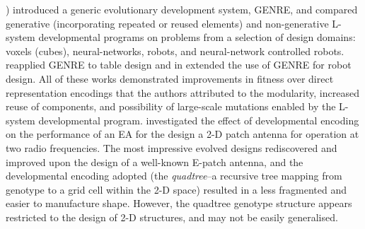 \cite{Hornby:2003jt}) introduced a generic evolutionary development system, GENRE, and compared generative (incorporating repeated or reused elements) and non-generative L-system developmental programs on problems from a selection of design domains: voxels (cubes), neural-networks, robots, and neural-network controlled robots.  \cite{Hornby:2005rw} reapplied GENRE to table design and in \cite{Hornby:2006kj} extended the use of GENRE for robot design. All of these works demonstrated improvements in fitness over direct representation encodings that the authors attributed to the modularity, increased reuse of components, and possibility of large-scale mutations enabled by the L-system developmental program. \cite{Dorica:2007li} investigated the effect of developmental encoding on the performance of an EA for the design a 2-D patch antenna for operation at two radio frequencies. The most impressive evolved designs rediscovered and improved upon the design of a well-known E-patch antenna, and the developmental encoding adopted (the \emph{quadtree}--a recursive tree mapping from genotype to a grid cell within the 2-D space) resulted in a less fragmented and easier to manufacture shape. However, the quadtree genotype structure appears restricted to the design of 2-D structures, and may not be easily generalised.
